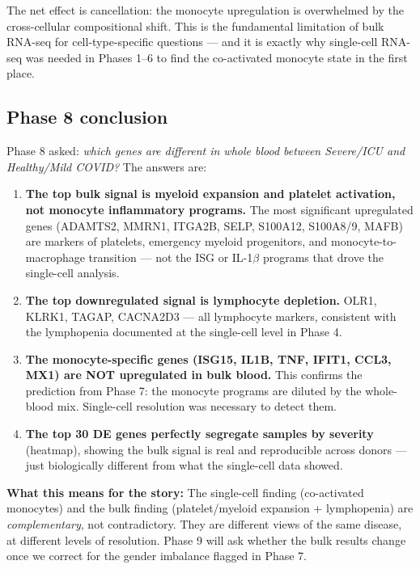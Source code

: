 \documentclass[11pt, a4paper]{article}
\begin{document}
The net effect is cancellation: the monocyte upregulation is overwhelmed by the
cross-cellular compositional shift. This is the fundamental limitation of bulk RNA-seq
for cell-type-specific questions — and it is exactly why single-cell RNA-seq was
needed in Phases 1--6 to find the co-activated monocyte state in the first place.

\subsection{Phase 8 conclusion}

Phase 8 asked: \textit{which genes are different in whole blood between Severe/ICU
and Healthy/Mild COVID?} The answers are:

\begin{enumerate}[nosep]
  \item \textbf{The top bulk signal is myeloid expansion and platelet activation,
        not monocyte inflammatory programs.}
        The most significant upregulated genes (ADAMTS2, MMRN1, ITGA2B, SELP,
        S100A12, S100A8/9, MAFB) are markers of platelets, emergency myeloid progenitors,
        and monocyte-to-macrophage transition — not the ISG or IL-1$\beta$ programs
        that drove the single-cell analysis.

  \item \textbf{The top downregulated signal is lymphocyte depletion.}
        OLR1, KLRK1, TAGAP, CACNA2D3 — all lymphocyte markers, consistent
        with the lymphopenia documented at the single-cell level in Phase 4.

  \item \textbf{The monocyte-specific genes (ISG15, IL1B, TNF, IFIT1, CCL3, MX1)
        are NOT upregulated in bulk blood.}
        This confirms the prediction from Phase 7: the monocyte programs are
        diluted by the whole-blood mix. Single-cell resolution was necessary
        to detect them.

  \item \textbf{The top 30 DE genes perfectly segregate samples by severity}
        (heatmap), showing the bulk signal is real and reproducible across donors
        — just biologically different from what the single-cell data showed.
\end{enumerate}

\textbf{What this means for the story:}
The single-cell finding (co-activated monocytes) and the bulk finding (platelet/myeloid
expansion + lymphopenia) are \textit{complementary}, not contradictory.
They are different views of the same disease, at different levels of resolution.
Phase 9 will ask whether the bulk results change once we correct for the gender
imbalance flagged in Phase 7.
\end{document}
